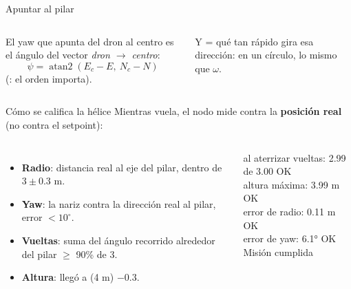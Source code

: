 \begin{frame}{Apuntar al pilar}
  \begin{columns}[c]
    \centering
    \small
    El yaw que apunta del dron al centro es el ángulo del vector \emph{dron $\rightarrow$ centro}:
    \[ \psi = \operatorname{atan2}(E_c - E,\ N_c - N) \]
    (: el orden importa).
    \vspace{0.3em}

    Y  = qué tan rápido gira esa dirección: en un círculo, lo mismo que $\omega$.
  \end{columns}
\end{frame}

\begin{frame}{Cómo se califica la hélice}
  \small Mientras vuela, el nodo mide contra la \textbf{posición real} (no contra el setpoint):
  \begin{columns}[c]
    \begin{itemize}
      \item \textbf{Radio}: distancia real al eje del pilar, dentro de $3 \pm 0.3$ m.
      \item \textbf{Yaw}: la nariz contra la dirección real al pilar, error $< 10^\circ$.
      \item \textbf{Vueltas}: suma del ángulo recorrido alrededor del pilar $\geq$ 90\% de 3.
      \item \textbf{Altura}: llegó a  (4 m) $- 0.3$.
    \end{itemize}
    \begin{terminal}{al aterrizar}
vueltas: 2.99 de 3.00 OK\\
altura máxima: 3.99 m OK\\
error de radio: 0.11 m OK\\
error de yaw: 6.1° OK\\
Misión cumplida
    \end{terminal}
  \end{columns}
\end{frame}

